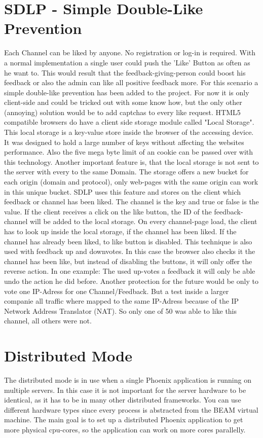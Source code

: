 \section{SDLP - Simple Double-Like Prevention}
Each Channel can be liked by anyone. No registration or log-in is required. With a normal implementation a single user could push the 'Like' Button as often as he want to. This would result that the feedback-giving-person could boost his feedback or also the admin can like all positive feedback more. For this scenario a simple double-like prevention has been added to the project. For now it is only client-side and could be tricked out with some know how, but the only other (annoying) solution would be to add captchas to every like request. 
HTML5 compatible browsers do have a client side storage module called "Local Storage". This local storage is a key-value store inside the browser of the accessing device. It was designed to hold a large number of keys without affecting the websites performance. Also the five mega byte limit of an cookie can be passed over with this technology. Another important feature is, that the local storage is not sent to the server with every to the same Domain. The storage offers a new bucket for each origin (domain and protocol), only web-pages with the same origin can work in this unique bucket. 
SDLP uses this feature and stores on the client which feedback or channel has been liked. The channel is the key and true or false is the value. If the client receives a click on the like button, the ID of the feedback-channel will be added to the local storage. On every channel-page load, the client has to look up inside the local storage, if the channel has been liked. If the channel has already been liked, to like button is disabled. 
This technique is also used with feedback up and downvotes. In this case the browser also checks it the channel has been like, but instead of disabling the buttons, it will only offer the reverse action. In one example: The used up-votes a feedback it will only be able undo the action he did before. 
Another protection for the future would be only to vote one IP-Adress for one Channel/Feedback. But a test inside a larger companie all traffic where mapped to the same IP-Adress because of the IP Network Address Translator (NAT). So only one of 50 was able to like this channel, all others were not.  \cite{rfc2663}

\section{Distributed Mode} \label{distribued_mode}
The distributed mode is in use when a single Phoenix application is running on multiple servers. In this case it is not important for the server hardware to be identical, as it has to be in many other distributed frameworks. You can use different hardware types since every process is abstracted from the BEAM virtual machine. The main goal is to set up a distributed Phoenix application to get more physical cpu-cores, so the application can work on more cores parallelly.

